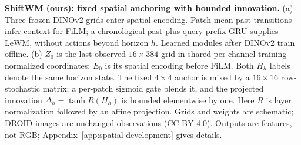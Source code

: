 \textbf{ShiftWM (ours): fixed spatial anchoring with bounded innovation.} (a) Three frozen DINOv2 grids enter spatial encoding. Patch-mean past transitions infer context for FiLM; a chronological past-plus-query-prefix GRU supplies LeWM, without actions beyond horizon $h$. Learned modules after DINOv2 train offline. (b) $Z_0$ is the last observed $16\!\times\!384$ grid in shared per-channel training-normalized coordinates; $E_0$ is its spatial encoding before FiLM. Both $H_h$ labels denote the same horizon state. The fixed $4\!\times\!4$ anchor is mixed by a $16\!\times\!16$ row-stochastic matrix; a per-patch sigmoid gate blends it, and the projected innovation $\Delta_h=\tanh R(H_h)$ is bounded elementwise by one. Here $R$ is layer normalization followed by an affine projection. Grids and weights are schematic; DROID images are unchanged observations (CC BY 4.0). Outputs are features, not RGB; Appendix~\ref{app:spatial-development} gives details.
